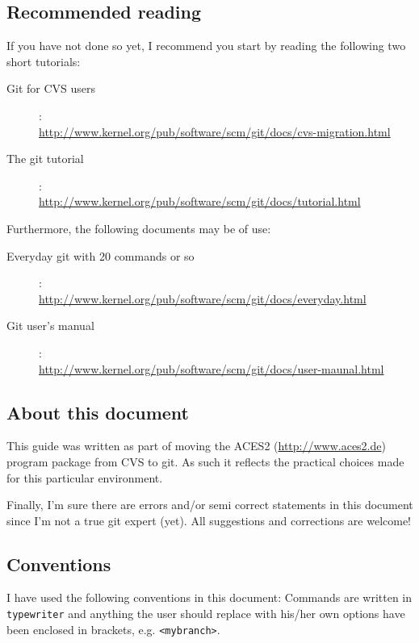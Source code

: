 \documentclass[a4paper,10pt]{article}
\begin{document}

\subsection{Recommended reading}
If you have not done so yet, I
recommend you start by reading the following two short tutorials:
\begin{description}
\item[Git for CVS users]:\\
\url{http://www.kernel.org/pub/software/scm/git/docs/cvs-migration.html}
\item[The git tutorial]:\\
\url{http://www.kernel.org/pub/software/scm/git/docs/tutorial.html}
\end{description}
Furthermore, the following documents may be of use:
\begin{description}
\item[Everyday git with 20 commands or so]:\\
\url{http://www.kernel.org/pub/software/scm/git/docs/everyday.html}
\item[Git user's manual]:\\
\url{http://www.kernel.org/pub/software/scm/git/docs/user-maunal.html}
\end{description}

\subsection{About this document}
This guide was written as part of moving the ACES2 (\url{http://www.aces2.de})
program package from CVS to git. As such it reflects the 
practical choices made for this particular environment. 

Finally, I'm sure there are errors and/or semi correct statements in this
document since I'm not a true git expert (yet). All suggestions and
corrections are welcome!

\subsection{Conventions}
I have used the following conventions in this document: Commands are written 
in {\tt typewriter} and anything the user should replace with his/her own 
options have been enclosed in brackets, e.g. {\tt <mybranch>}.  
\end{document}
